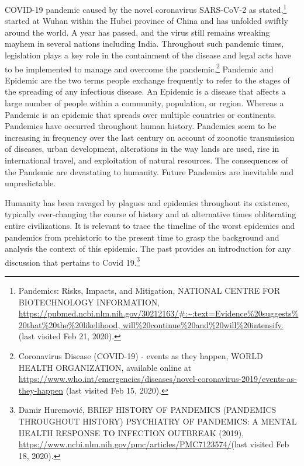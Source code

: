 \begin{multicols}{2}
\noi
COVID-19 pandemic caused by the novel coronavirus SARS-CoV-2 as stated,\footnote{Pandemics: Risks, Impacts, and Mitigation, NATIONAL CENTRE FOR BIOTECHNOLOGY INFORMATION,
 \url{https://pubmed.ncbi.nlm.nih.gov/30212163/#:~:text=Evidence\%20suggests\%20that\%20the\%20likelihood, will\%20continue\%20and\%20will\%20intensify.} (last visited Feb 21, 2020).} started at
Wuhan within the Hubei province of China and has unfolded swiftly around the world. A
year has passed, and the virus still remains wreaking mayhem in several nations including
India. Throughout such pandemic times, legislation plays a key role in the containment of the
disease and legal acts have to be implemented to manage and overcome the pandemic.\footnote{Coronavirus Disease (COVID-19) - events as they happen, WORLD HEALTH ORGANIZATION, available online at \url{https://www.who.int/emergencies/diseases/novel-coronavirus-2019/events-as-they-happen} (last visited Feb 15, 2020).}
Pandemic and Epidemic are the two terms people exchange frequently to refer to the stages
of the spreading of any infectious disease. An Epidemic is a disease that affects a large
number of people within a community, population, or region. Whereas a Pandemic is an
epidemic that spreads over multiple countries or continents. Pandemics have occurred
throughout human history. Pandemics seem to be increasing in frequency over the last
century on account of zoonotic transmission of diseases, urban development, alterations in
the way lands are used, rise in international travel, and exploitation of natural resources. The 
consequences of the Pandemic are devastating to humanity. Future Pandemics are inevitable
and unpredictable.

\noi
Humanity has been ravaged by plagues and epidemics throughout its existence, typically
ever-changing the course of history and at alternative times obliterating entire civilizations. It
is relevant to trace the timeline of the worst epidemics and pandemics from prehistoric to the
present time to grasp the background and analysis the context of this epidemic. The past
provides an introduction for any discussion that pertains to Covid 19.\footnote{Damir Huremović, BRIEF HISTORY OF PANDEMICS (PANDEMICS THROUGHOUT HISTORY) PSYCHIATRY OF PANDEMICS: A MENTAL HEALTH RESPONSE TO INFECTION OUTBREAK (2019), \url{https://www.ncbi.nlm.nih.gov/pmc/articles/PMC7123574/}(last visited Feb 18, 2020).}


\end{multicols}
